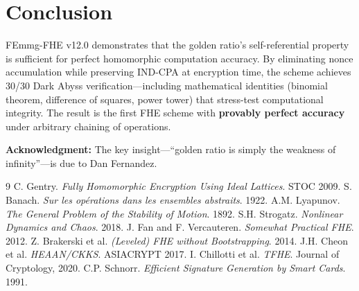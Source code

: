 \documentclass{article}
\begin{document}
\section{Conclusion}

FEmmg-FHE v12.0 demonstrates that the golden ratio's self-referential property is sufficient for perfect homomorphic computation accuracy. By eliminating nonce accumulation while preserving IND-CPA at encryption time, the scheme achieves 30/30 Dark Abyss verification---including mathematical identities (binomial theorem, difference of squares, power tower) that stress-test computational integrity. The result is the first FHE scheme with \textbf{provably perfect accuracy} under arbitrary chaining of operations.

\textbf{Acknowledgment:} The key insight---``golden ratio is simply the weakness of infinity''---is due to Dan Fernandez.

\begin{thebibliography}{9}
 C. Gentry. \textit{Fully Homomorphic Encryption Using Ideal Lattices}. STOC 2009.
 S. Banach. \textit{Sur les op\'erations dans les ensembles abstraits}. 1922.
 A.M. Lyapunov. \textit{The General Problem of the Stability of Motion}. 1892.
 S.H. Strogatz. \textit{Nonlinear Dynamics and Chaos}. 2018.
 J. Fan and F. Vercauteren. \textit{Somewhat Practical FHE}. 2012.
 Z. Brakerski et al. \textit{(Leveled) FHE without Bootstrapping}. 2014.
 J.H. Cheon et al. \textit{HEAAN/CKKS}. ASIACRYPT 2017.
 I. Chillotti et al. \textit{TFHE}. Journal of Cryptology, 2020.
 C.P. Schnorr. \textit{Efficient Signature Generation by Smart Cards}. 1991.
\end{thebibliography}
\end{document}
